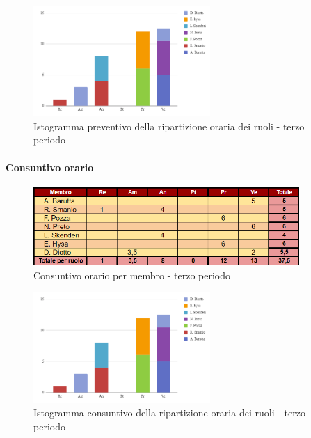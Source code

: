 \vspace{0.4cm}

\begin{figure}[H]
    \centering
    \includegraphics[width=0.6\textwidth]{../Images/preventivoDivisioneRuoli3Periodo.png}
    \caption{Istogramma preventivo della ripartizione oraria dei ruoli - terzo periodo}
    \label{fig:Preventivo_ripartizione_oraria_3}
\end{figure}

\paragraph{Consuntivo orario} 

\begin{figure}[H]
    \centering
    \includegraphics[width=0.9\textwidth]{../Images/consuntivoOrario3Periodo.png}
    \caption{Consuntivo orario per membro - terzo periodo}
    \label{fig:Constuntivo_orario_3}
\end{figure}

\vspace{0.6cm}

\begin{figure}[H]
    \centering
    \includegraphics[width=0.6\textwidth]{../Images/consuntivoDivisioneRuoli3Periodo.png}
    \caption{Istogramma consuntivo della ripartizione oraria dei ruoli - terzo periodo}
    \label{fig:Consuntivo_ripartizione_oraria_3}
\end{figure}


